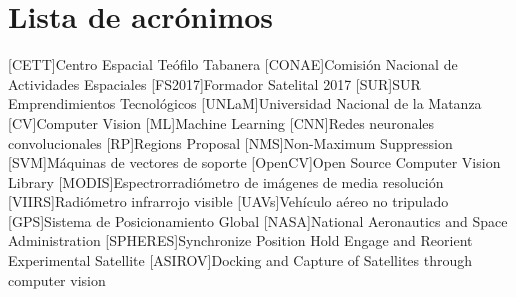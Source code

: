 \chapter*{Lista de acrónimos}
\label{chap:acronimos}

\begin{acronym}
[CETT]{Centro Espacial Teófilo Tabanera}
[CONAE]{Comisión Nacional de Actividades Espaciales}
[FS2017]{Formador Satelital 2017}
[SUR]{SUR Emprendimientos Tecnológicos}
[UNLaM]{Universidad Nacional de la Matanza}
[CV]{Computer Vision}
[ML]{Machine Learning}
[CNN]{Redes neuronales convolucionales}
[RP]{Regions Proposal}
[NMS]{Non-Maximum Suppression}
[SVM]{Máquinas de vectores de soporte}
[OpenCV]{Open Source Computer Vision Library}
[MODIS]{Espectrorradiómetro de imágenes de media resolución}
[VIIRS]{Radiómetro infrarrojo visible}
[UAVs]{Vehículo aéreo no tripulado}
[GPS]{Sistema de Posicionamiento Global}
[NASA]{National Aeronautics and Space Administration}
[SPHERES]{Synchronize Position Hold Engage and Reorient Experimental Satellite}
 [ASIROV]{Docking and Capture of Satellites through computer vision}
\end{acronym}


